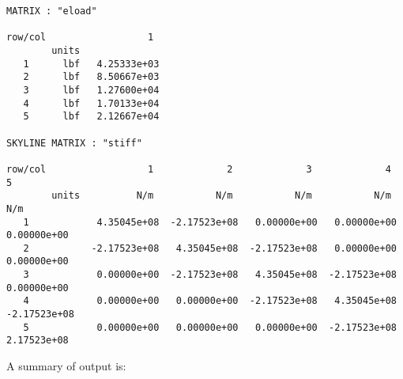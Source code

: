 \begin{footnotesize}
\begin{verbatim}
MATRIX : "eload"

row/col                  1   
        units                
   1      lbf   4.25333e+03
   2      lbf   8.50667e+03
   3      lbf   1.27600e+04
   4      lbf   1.70133e+04
   5      lbf   2.12667e+04

SKYLINE MATRIX : "stiff"

row/col                  1             2             3             4             5   
        units          N/m           N/m           N/m           N/m           N/m   
   1            4.35045e+08  -2.17523e+08   0.00000e+00   0.00000e+00   0.00000e+00 
   2           -2.17523e+08   4.35045e+08  -2.17523e+08   0.00000e+00   0.00000e+00 
   3            0.00000e+00  -2.17523e+08   4.35045e+08  -2.17523e+08   0.00000e+00 
   4            0.00000e+00   0.00000e+00  -2.17523e+08   4.35045e+08  -2.17523e+08 
   5            0.00000e+00   0.00000e+00   0.00000e+00  -2.17523e+08   2.17523e+08 
\end{verbatim}
\end{footnotesize}

\vspace{0.15 in}\noindent
A summary of output is:

